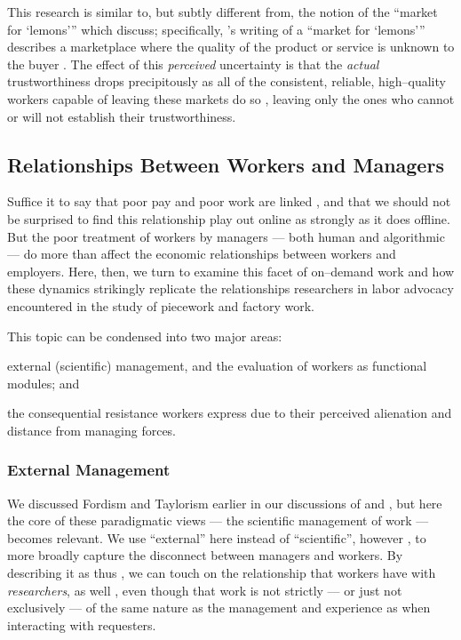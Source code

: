 \documentclass[trackingWork]{subfiles}
\begin{document}
{    This research is similar to, but subtly different from, the notion of the ``market for `lemons'''
    which \citeauthor{fort2011amazon} discuss;
    specifically, \citeauthor{akerlof1970market}'s writing of a ``market for `lemons'''
    describes a marketplace where the quality of the product or service is unknown to the buyer
    \cite{fort2011amazon,akerlof1970market}.
    The effect of this \textit{perceived} uncertainty is that
    the \textit{actual} trustworthiness drops precipitously
    as all of the consistent, reliable, high--quality workers capable of leaving these markets do so%
,     leaving only the ones who cannot or will not establish their trustworthiness.

    \subsection{Relationships Between Workers and Managers}
    Suffice it to say that poor pay and poor work are linked%
,     and that we should not be surprised to find this relationship play out online as strongly as it does offline.
    But the poor treatment of workers by managers
    --- both human and algorithmic ---
    do more than affect the economic relationships between workers and employers.
    Here, then, we turn to examine this facet of on--demand work
    and how these dynamics strikingly replicate the relationships
    researchers in labor advocacy encountered in the study of piecework and factory work.

    This topic can be condensed into two major areas:
    \begin{inlinelist}
    \item external (scientific) management, and the evaluation of workers as functional modules; and
    \item the consequential resistance workers express due to their perceived alienation and distance from managing forces.
    \end{inlinelist}

    \subsubsection{External Management}
    We discussed Fordism and Taylorism earlier in our discussions of
     and %
,     but here the core of these paradigmatic views
    --- the scientific management of work ---
    becomes relevant.
    We use ``external'' here instead of ``scientific'', however%
,     to more broadly capture the disconnect between managers and workers.
    By describing it as thus%
,     we can touch on the relationship that workers have with \textit{researchers}, as well%
,     even though that work is not strictly
    --- or just not exclusively ---
    of the same nature as the management and experience as when interacting with requesters.

}
\end{document}
